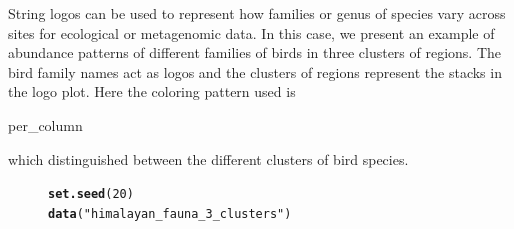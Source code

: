 \documentclass[12pt]{article}\usepackage[]{graphicx}\usepackage[usenames,dvipsnames]{color}
\makeatletter
\newcommand{\hlnum}[1]{\textcolor[rgb]{0.686,0.059,0.569}{#1}}%
\newcommand{\hlstr}[1]{\textcolor[rgb]{0.192,0.494,0.8}{#1}}%
\newcommand{\hlstd}[1]{\textcolor[rgb]{0.345,0.345,0.345}{#1}}%
\newcommand{\hlkwd}[1]{\textcolor[rgb]{0.737,0.353,0.396}{\textbf{#1}}}%
\newenvironment{kframe}{%
 \def\at@end@of@kframe{}%
 \ifinner\ifhmode%
  \def\at@end@of@kframe{\end{minipage}}%
  \begin{minipage}{\columnwidth}%
 \fi\fi%
 \def\FrameCommand##1{\hskip\@totalleftmargin \hskip-\fboxsep
 \colorbox{shadecolor}{##1}\hskip-\fboxsep
     \hskip-\linewidth \hskip-\@totalleftmargin \hskip\columnwidth}%
 \MakeFramed {\advance\hsize-\width
   \@totalleftmargin\z@ \linewidth\hsize
   \@setminipage}}%
 {\par\unskip\endMakeFramed%
 \at@end@of@kframe}
\newenvironment{knitrout}{}{} %
\makeatother
\begin{document}
String logos can be used to represent how families or genus of species vary across sites for ecological or metagenomic data. In this case, we present an example of abundance patterns of different families of birds in three clusters of regions. The bird family names act as logos and the clusters of regions represent the stacks in the logo plot. Here the coloring pattern used is \begin{verb} per_column \end{verb} which distinguished between the different clusters of bird species.

\begin{figure}[h]
\begin{center}
\begin{knitrout}
\color{fgcolor}\begin{kframe}
\begin{alltt}
\hlkwd{set.seed}\hlstd{(}\hlnum{20}\hlstd{)}
\hlkwd{data}\hlstd{(}\hlstr{"himalayan_fauna_3_clusters"}\hlstd{)}


\end{alltt}
\end{kframe}
\end{knitrout}
\end{center}
\end{figure}
\end{document}

